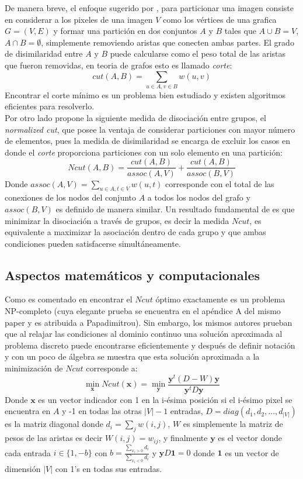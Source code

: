 \documentclass[conference]{IEEEtran}
\begin{document}
De manera breve, el enfoque sugerido por \cite{Ncut}, para particionar una imagen consiste en considerar a los pixeles de una imagen $V$ como los vértices de una grafica $G=(V,E)$ y formar una partición en dos conjuntos $A$ y $B$ tales que $A \cup B = V$, $A \cap B = \emptyset $, simplemente removiendo aristas que conecten ambas partes. El grado de disimilaridad entre $A$ y $B$ puede calcularse como el peso total de las aristas que fueron removidas, en teoria de grafos esto es llamado \textit{corte}:
\[
cut(A,B) = \sum_{u\in A, v\in B} w(u,v)
\]
Encontrar el corte mínimo es un problema bien estudiado y existen algoritmos eficientes para resolverlo. \\

Por otro lado \cite{Ncut} propone la siguiente medida de disociación entre grupos, el \textit{normalized cut}, que posee la ventaja de considerar particiones con mayor número de elementos, pues la medida de disimilaridad se encarga de excluir los casos en donde el \textit{corte} proporciona particiones con un solo elemento en una partición:
\[
Ncut(A,B)= \frac{cut(A,B)}{assoc(A,V)}+\frac{cut(A,B)}{assoc(B,V)}
\]
Donde $assoc(A, V) = \sum_{u\in A,t\in V}w(u,t)$ corresponde con el total de las conexiones de los nodos del conjunto $A$ a todos los nodos del grafo y $assoc(B,V)$ es definido de manera similar. Un resultado fundamental de \cite{Ncut} es que minimizar la disociación a través de grupos, es decir la medida $Ncut$, es equivalente a maximizar la asociación dentro de cada grupo y que ambas condiciones pueden satisfacerse simultáneamente.   


\subsection{Aspectos matemáticos y computacionales}

Como es comentado en \cite{Ncut} encontrar el $Ncut$ óptimo exactamente es un problema NP-completo (cuya elegante prueba se encuentra en el apéndice A del mismo paper y es atribuida a Papadimitrou). Sin embargo, los mismos autores prueban que al relajar las condiciones al dominio continuo una solución aproximada al problema discreto puede encontrarse eficientemente y después de definir notación y con un poco de álgebra se muestra que esta solución aproximada a la minimización de $Ncut$ corresponde a:
\begin{equation}
\min_{\boldsymbol{x}} \textit{Ncut} (\boldsymbol{x}) = \min_{\boldsymbol{y}} \frac{\boldsymbol{y}^t(D-W)\boldsymbol{y}}{\boldsymbol{y}^tD\boldsymbol{y}}
\end{equation}
Donde $ \boldsymbol{x}$ es un vector indicador con 1 en la i-ésima posición si el i-ésimo pixel se encuentra en $A$ y -1 en todas las otras $|V|-1$ entradas, $D=diag(d_1,d_2,…,d_{|V|})$ es la matriz diagonal donde $d_i=\sum_j w(i,j)$, $W$ es simplemente la matriz de pesos de las aristas es decir $W (i,j)=w_{ij}$, y finalmente $ \boldsymbol{y}$ es el vector donde cada entrada $i\in \{1,-b\}$ con $b = \frac{\sum_{x_i>0}d_i}{\sum_{x_i<0}d_i}$ y $ \boldsymbol{y}D \boldsymbol{1} = 0$ donde $ \boldsymbol{1}$ es un vector de dimensión $|V|$ con 1’s en todas sus entradas. \\
\end{document}
